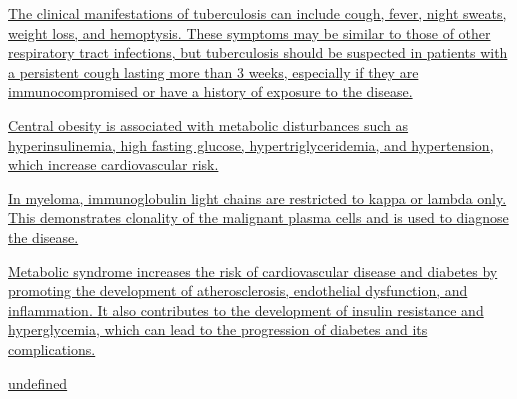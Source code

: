 \documentclass[10pt, a4paper]{article}
\begin{document}
\begin{multicols}{2}
\begin{enumerate}
 \vspace{6pt} 

\parbox{\linewidth}{\item \href{https://www.notion.so/Clinical-Pathology-Tuberculosis-bf552be4dfd343499b2c88fd8776c33f}{ The clinical manifestations of tuberculosis can include cough, fever, night sweats, weight loss, and hemoptysis. These symptoms may be similar to those of other respiratory tract infections, but tuberculosis should be suspected in patients with a persistent cough lasting more than 3 weeks, especially if they are immunocompromised or have a history of exposure to the disease.}} 

 \vspace{6pt} 

\parbox{\linewidth}{\item \href{https://www.notion.so/Introduction-to-bariatric-syndromes-bd7faa5f432a4dbfaad7215533604702}{ Central obesity is associated with metabolic disturbances such as hyperinsulinemia, high fasting glucose, hypertriglyceridemia, and hypertension, which increase cardiovascular risk.}} 

 \vspace{6pt} 

\parbox{\linewidth}{\item \href{https://www.notion.so/Lymphoma-and-Myeloma-1eff452307b84bbb8c322dccc30bf017}{ In myeloma, immunoglobulin light chains are restricted to kappa or lambda only. This demonstrates clonality of the malignant plasma cells and is used to diagnose the disease.}} 

 \vspace{6pt} 

\parbox{\linewidth}{\item \href{https://www.notion.so/Cardiometabolic-Syndrome-2217e00035bb4d999ce7d5b4f16ff92d}{ Metabolic syndrome increases the risk of cardiovascular disease and diabetes by promoting the development of atherosclerosis, endothelial dysfunction, and inflammation. It also contributes to the development of insulin resistance and hyperglycemia, which can lead to the progression of diabetes and its complications.}} 

 \vspace{6pt} 

\parbox{\linewidth}{\item \href{https://www.notion.so/Infective-Heart-Disease-db7843efa7234f14a0504128e4dda2f4}{undefined}} 

 \vspace{6pt} 


\end{enumerate}
\end{multicols}
\end{document}
